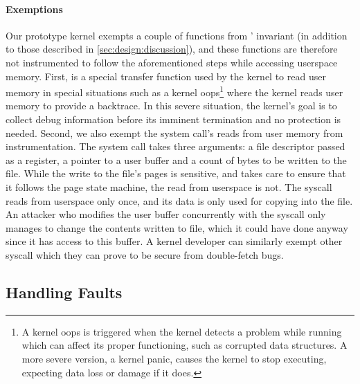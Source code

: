 \documentclass[letterpaper,twocolumn,10pt]{article}
\begin{document}
\paragraph{Exemptions}
Our prototype \midas kernel exempts a couple of functions
from \midas' invariant (in addition to those described in
\autoref{sec:design:discussion}), and these functions are
therefore not instrumented
to follow the aforementioned steps while accessing userspace
memory.
First,  is a special
transfer function used by the kernel to
read user memory in special situations such as a kernel
oops\footnote{A kernel oops is triggered when the kernel detects a
problem while running which can affect its proper functioning, such
as corrupted data structures.
A more severe version, a kernel panic, causes the kernel to stop
executing, expecting data loss or damage if it does.}
where the kernel reads user memory to provide a backtrace.
In this severe situation, the kernel's goal is to collect debug
information before its imminent termination and no \tocttou protection
is needed.
Second, we also exempt the  system
call's reads from user memory from instrumentation.
The  system call takes three arguments: a
file descriptor passed as a register, a pointer to a user
buffer and a count of bytes to be written to the file.
While the write to the file's pages is sensitive, and
\midas takes care to ensure that it follows the page state
machine, the read from userspace is not.
The syscall reads from userspace only once, and its data
is only used for copying into the file.
An attacker who modifies the user buffer concurrently with
the syscall only manages to change the contents written to
file, which it could have done anyway since it has access to
this buffer.
A kernel developer can similarly exempt other syscall which
they can prove to be secure from double-fetch bugs.


\subsection{Handling Faults}
\end{document}
